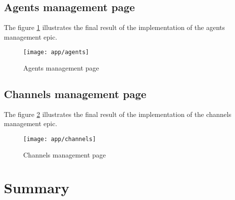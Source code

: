 \subsection{Agents management page}
The figure \ref{ss-agents} illustrates the final result of the implementation of the agents management epic.
\begin{figure}[hbt!]
    \centering
    \texttt{[image: app/agents]}
    \caption{Agents management page}
    \label{ss-agents}
\end{figure}

\subsection{Channels management page}
The figure \ref{ss-channels} illustrates the final result of the implementation of the channels management epic.
\begin{figure}[hbt!]
    \centering
    \texttt{[image: app/channels]}
    \caption{Channels management page}
    \label{ss-channels}
\end{figure}

\section*{Summary}
